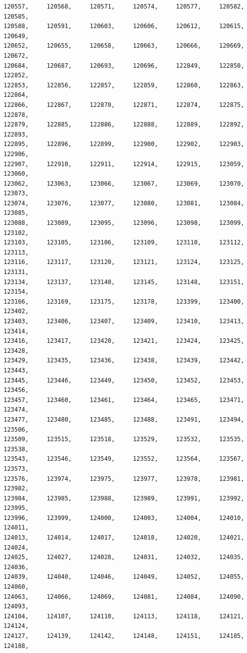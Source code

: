 \documentclass[a4paper,11pt]{report}
\begin{document}
\begin{verbatim}
120557,     120568,     120571,     120574,     120577,     120582,     120585,
120588,     120591,     120603,     120606,     120612,     120615,     120649,
120652,     120655,     120658,     120663,     120666,     120669,     120672,
120684,     120687,     120693,     120696,     122849,     122850,     122852,
122853,     122856,     122857,     122859,     122860,     122863,     122864,
122866,     122867,     122870,     122871,     122874,     122875,     122878,
122879,     122885,     122886,     122888,     122889,     122892,     122893,
122895,     122896,     122899,     122900,     122902,     122903,     122906,
122907,     122910,     122911,     122914,     122915,     123059,     123060,
123062,     123063,     123066,     123067,     123069,     123070,     123073,
123074,     123076,     123077,     123080,     123081,     123084,     123085,
123088,     123089,     123095,     123096,     123098,     123099,     123102,
123103,     123105,     123106,     123109,     123110,     123112,     123113,
123116,     123117,     123120,     123121,     123124,     123125,     123131,
123134,     123137,     123140,     123145,     123148,     123151,     123154,
123166,     123169,     123175,     123178,     123399,     123400,     123402,
123403,     123406,     123407,     123409,     123410,     123413,     123414,
123416,     123417,     123420,     123421,     123424,     123425,     123428,
123429,     123435,     123436,     123438,     123439,     123442,     123443,
123445,     123446,     123449,     123450,     123452,     123453,     123456,
123457,     123460,     123461,     123464,     123465,     123471,     123474,
123477,     123480,     123485,     123488,     123491,     123494,     123506,
123509,     123515,     123518,     123529,     123532,     123535,     123538,
123543,     123546,     123549,     123552,     123564,     123567,     123573,
123576,     123974,     123975,     123977,     123978,     123981,     123982,
123984,     123985,     123988,     123989,     123991,     123992,     123995,
123996,     123999,     124000,     124003,     124004,     124010,     124011,
124013,     124014,     124017,     124018,     124020,     124021,     124024,
124025,     124027,     124028,     124031,     124032,     124035,     124036,
124039,     124040,     124046,     124049,     124052,     124055,     124060,
124063,     124066,     124069,     124081,     124084,     124090,     124093,
124104,     124107,     124110,     124113,     124118,     124121,     124124,
124127,     124139,     124142,     124148,     124151,     124185,     124188,

\end{verbatim}
\end{document}
